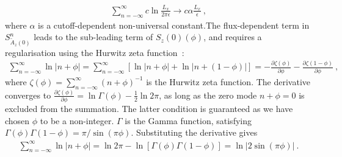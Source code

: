 \begin{equation}\begin{aligned}
	\sum_{n=-\infty}^\infty c\ln \frac{L_x}{2\pi\epsilon} \to c\alpha \frac{L_x}{\epsilon}~,
\end{aligned}\end{equation}
where \(\alpha\) is a cutoff-dependent non-universal constant.The flux-dependent term in \(S_{\widetilde{A}_{z}(0)}^n\) leads to the sub-leading term of \(S_{z}(0)(\phi)\), and requires a regularisation using the Hurwitz zeta function~\cite{Chen_2017}:
\begin{equation}\begin{aligned}
	\sum_{n=-\infty}^\infty \ln|n+\phi| = \sum_{n=-\infty}^\infty \left[\ln|n+\phi| + \ln|n+\left( 1-\phi \right) |\right] = -\frac{\partial{\zeta(\phi)}}{\partial{\phi}} - \frac{\partial{\zeta(1-\phi)}}{\partial{\phi}}~,
\end{aligned}\end{equation}
where \(\zeta(\phi)=\sum_{n=-\infty}^\infty \left(n+\phi\right)^{-1} \) is the Hurwitz zeta function.
The derivative converges to \(\frac{\partial{\zeta(\phi)}}{\partial{\phi}} = \ln \Gamma(\phi) - \frac{1}{2}\ln 2\pi\), as long as the zero mode \(n+\phi=0\) is excluded from the summation. The latter condition is guaranteed as we have chosen \(\phi\) to be a non-integer. \(\Gamma\) is the Gamma function, satisfying \(\Gamma(\phi)\Gamma(1 - \phi) = \pi/\sin(\pi\phi)\).
Substituting the derivative gives~\cite{Arias_2015,Chen_2017,crepel_2021}
\begin{equation}\begin{aligned}
	\label{gamma}
	\sum_{n=-\infty}^\infty \ln|n+\phi| = \ln 2\pi -\ln \left[\Gamma(\phi)\Gamma(1-\phi)\right] = \ln \big|2\sin\left( \pi\phi \right) \big|~.
\end{aligned}\end{equation}


